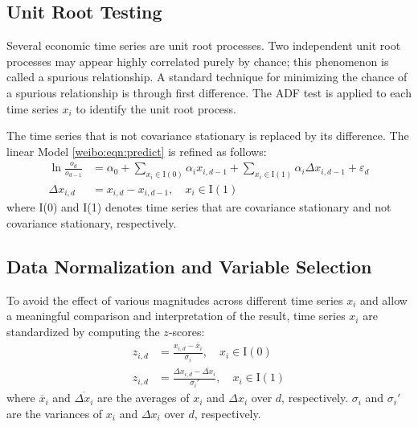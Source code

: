\documentclass[review,3p,times,12pt,number]{elsarticle}
\begin{document}
\subsection{Unit Root Testing}
 Several economic time series are unit root processes. Two independent unit root processes may appear highly correlated purely by chance; this phenomenon is called a spurious relationship. A standard technique for minimizing the chance of a spurious relationship is through first difference. The ADF test is applied to each time series $x_i$ to identify the unit root process.

The time series that is not covariance stationary is replaced by its difference. The linear Model \ref{weibo:eqn:predict} is refined as follows:
\begin{equation}
\label{weibo:eqn:unitroot}
\begin{split}
	\ln \frac{o_d}{o_{d-1}} & =   \alpha_0 + \sum_{x_i \in \mathrm I(0)} \alpha_i x_{i,d-1}  + \sum_{x_i \in \mathrm I(1)} \alpha_i \Delta x_{i,d-1}+  \varepsilon_d \\
	\Delta x_{i,d}          & =   x_{i, d} - x_{i, d-1},\quad x_i\in \mathrm I(1)
\end{split}
\end{equation}
where I(0) and I(1) denotes time series that are covariance stationary and not covariance stationary, respectively.

\subsection{Data Normalization and Variable Selection}

To avoid the effect of various magnitudes across different time series $x_i$ and allow a meaningful comparison and interpretation of the result, time series $x_i$ are standardized by computing the $z$-scores:
\begin{equation}
\begin{split}
    z_{i,d}  &  = \frac{x_{i,d} - \overline{x}_i}{\sigma_i}, \quad x_i\in \mathrm I(0)\\
    z_{i,d}  &  = \frac{\Delta x_{i,d}-\overline{\Delta x}_i}{\sigma_i'}, \quad x_i\in \mathrm I(1)
\end{split}
\end{equation}
where $\overline{x}_i$ and $\overline{\Delta x_i}$ are the averages of $x_i$ and $\Delta x_i$ over $d$, respectively. $\sigma_i$ and $\sigma_i'$ are the variances of $x_i$ and $\Delta x_i$ over $d$, respectively.
\end{document}
